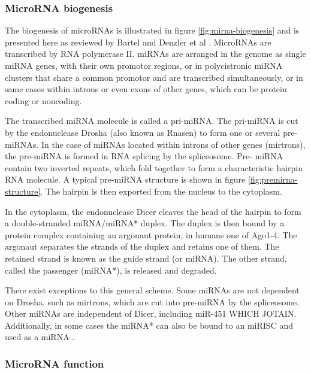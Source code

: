 \subsubsection{MicroRNA biogenesis}\label{microrna-biogenesis}

The biogenesis of microRNAs is illustrated in figure
\ref{fig:mirna-biogenesis} and is presented here as reviewed by Bartel 
\citep{Bartel2004} and Denzler et al \citep{Denzler2015}. MicroRNAs are
transcribed by RNA polymerase II. miRNAs are arranged in the genome as
single miRNA genes, with their own promotor regions,
or in polycistronic miRNA clusters that share a common promotor and are
transcribed simultaneously, or in same cases within introns or even exons of
other genes, which can be protein coding or noncoding.

The transcribed miRNA molecule is called a pri-miRNA. The pri-miRNA is cut by
the endonuclease Drosha (also known as Rnasen) to form one or several pre-
miRNAs. In the case of miRNAs located within introns of other genes
(mirtrons), the pre-miRNA is formed in RNA splicing by the spliceosome. Pre-
miRNA contain two inverted repeats, which fold together to form a
characteristic hairpin RNA molecule. A typical pre-miRNA structure is shown in
figure \ref{fig:premirna-structure}. The hairpin is then exported from the
nucleus to the cytoplasm.

In the cytoplasm, the endonuclease Dicer cleaves the head of the hairpin to
form a double-stranded miRNA/miRNA* duplex. The duplex is then bound by a
protein complex containing an argonaut protein, in humans one of Ago1-4. The
argonaut separates the strands of the duplex and retains one of them. The
retained strand is known as the guide strand (or miRNA). The other strand,
called the passenger (miRNA*), is released and degraded.

There exist exceptions to this general scheme. Some miRNAs are not dependent
on Drosha, such as mirtrons, which are cut into pre-miRNA by the spliceosome.
Other miRNAs are independent of Dicer, including miR-451 WHICH JOTAIN.
Additionally, in some cases the miRNA* can also be bound to an miRISC and used
as a miRNA \citep{CITE}.





\subsubsection{MicroRNA function}\label{microrna-function}

